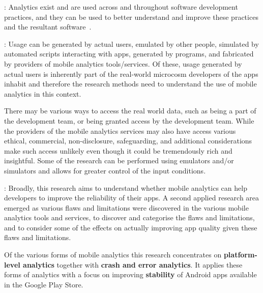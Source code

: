 
: Analytics exist and are used across and throughout software development practices, and they can be used to better understand and improve these practices and the resultant software~.

:
Usage can be generated by actual users, emulated by other people, simulated by automated scripts interacting with apps, generated by programs, and fabricated by providers of mobile analytics tools/services. Of these, usage generated by actual users is inherently part of the real-world microcosm developers of the apps inhabit and therefore the research methods need to understand the use of mobile analytics in this context. 

There may be various ways to access the real world data, such as being a part of the development team, or being granted access by the development team. While the providers of the mobile analytics services may also have access various ethical, commercial, non-disclosure, safeguarding, and additional considerations make such access unlikely even though it could be tremendously rich and insightful. Some of the research can be performed using emulators and/or simulators and allows for greater control of the input conditions.


: Broadly, this research aims to understand whether mobile analytics can help developers to improve the reliability of their apps. A second applied research area emerged as various flaws and limitations were discovered in the various mobile analytics tools and services, to discover and categorise the flaws and limitations, and to consider some of the effects on actually improving app quality given these flaws and limitations.

Of the various forms of mobile analytics this research concentrates on \textbf{platform-level analytics} together with \textbf{crash and error analytics}. It applies these forms of analytics with a focus on improving \textbf{stability} of Android apps available in the Google Play Store.

